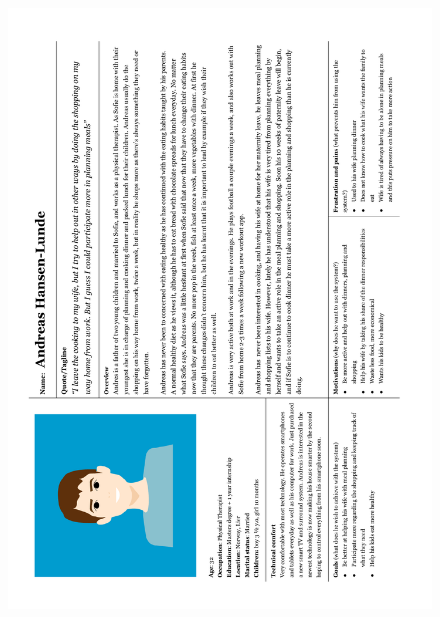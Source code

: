     \begin{figure}
        \centering
        \includegraphics[scale=0.65]{figures/personamale.pdf}
    \end{figure} 
    
